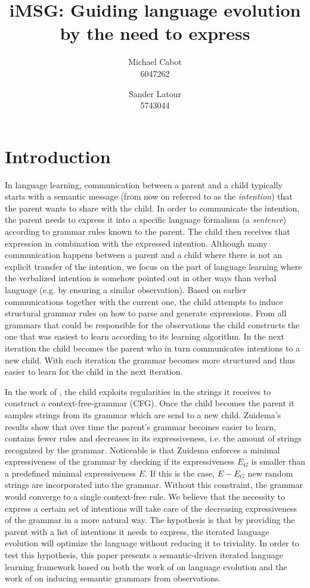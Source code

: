 \documentclass[a4paper]{article}
\title{iMSG: Guiding language evolution by the need to express}
\author{Michael Cabot\\6047262 \and Sander Latour\\5743044}
\begin{document}
\maketitle
\section{Introduction}
In language learning, communication between a parent and a child typically starts with a semantic message (from now on referred to as the \emph{intention}) that the parent wants to share with the child. In order to communicate the intention, the parent needs to express it into a specific language formalism (a \emph{sentence}) according to grammar rules known to the parent. The child then receives that expression in combination with the expressed intention. Although many communication happens between a parent and a child where there is not an explicit transfer of the intention, we focus on the part of language learning where the verbalized intention is somehow pointed out in other ways than verbal language (e.g. by ensuring a similar observation). Based on earlier communications together with the current one, the child attempts to induce structural grammar rules on how to parse and generate expressions. From all grammars that could be responsible for the observations the child constructs the one that was easiest to learn according to its learning algorithm.  In the next iteration the child becomes the parent who in turn communicates intentions to a new child. With each iteration the grammar becomes more structured and thus easier to learn for the child in the next iteration. 

In the work of \cite{zuidema2003poverty}, the child exploits regularities in the strings it receives to construct a context-free-grammar (CFG). Once the child becomes the parent it samples strings from its grammar which are send to a new child. Zuidema's results show that over time the parent's grammar becomes easier to learn, contains fewer rules and decreases in its expressiveness, i.e. the amount of strings recognized by the grammar. Noticeable is that Zuidema enforces a minimal expressiveness of the grammar by checking if its expressiveness $E_G$ is smaller than a predefined minimal expressiveness $E$. If this is the case, $E - E_G$ new random strings are incorporated into the grammar. Without this constraint, the grammar would converge to a single context-free rule. We believe that the necessity to express a certain set of intentions will take care of the decreasing expressiveness of the grammar in a more natural way. The hypothesis is that by providing the parent with a list of intentions it needs to express, the iterated language evolution will optimize the language without reducing it to triviality. In order to test this hypothesis, this paper presents a semantic-driven iterated language learning framework based on both the work of \cite{zuidema2003poverty} on language evolution and the work of \cite{batali1999negotiation} on inducing semantic grammars from observations.
\end{document}
